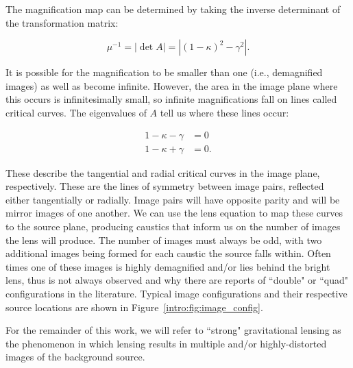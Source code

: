 The magnification map can be determined by taking the inverse determinant of the transformation matrix:

\begin{equation}
\mu^{-1} = |\det A| = |(1-\kappa)^2 - \gamma^2|.
\end{equation}

\noindent It is possible for the magnification to be smaller than one (i.e., demagnified images) as well as become infinite. However, the area in the image plane where this occurs is infinitesimally small, so infinite magnifications fall on lines called critical curves. The eigenvalues of $A$ tell us where these lines occur:

\begin{align}
1-\kappa-\gamma &= 0 \\
1-\kappa+\gamma &= 0.
\end{align}

\noindent These describe the tangential and radial critical curves in the image plane, respectively. These are the lines of symmetry between image pairs, reflected either tangentially or radially. Image pairs will have opposite parity and will be mirror images of one another. We can use the lens equation to map these curves to the source plane, producing caustics that inform us on the number of images the lens will produce. The number of images must always be odd, with two additional images being formed for each caustic the source falls within. Often times one of these images is highly demagnified and/or lies behind the bright lens, thus is not always observed and why there are reports of ``double" or ``quad" configurations in the literature. Typical image configurations and their respective source locations are shown in Figure~\ref{intro:fig:image_config}.

For the remainder of this work, we will refer to ``strong" gravitational lensing as the phenomenon in which lensing results in multiple and/or highly-distorted images of the background source.

